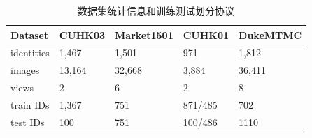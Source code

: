 \begin{table}
	\centering
	\caption{数据集统计信息和训练测试划分协议}
	\label{table:dataset}
	\begin{tabular}{lllll}
		\toprule
		Dataset    & CUHK03 & Market1501 & CUHK01  & DukeMTMC \\
		\midrule
		identities & 1,467  & 1,501      & 971     & 1,812     \\
		images     & 13,164 & 32,668     & 3,884   & 36,411    \\
		views      & 2      & 6          & 2       & 8           \\
		train IDs  & 1,367  & 751        & 871/485 & 702        \\
		test IDs   & 100    & 751        & 100/486 & 1110        \\
		\bottomrule
	\end{tabular}
\end{table}


